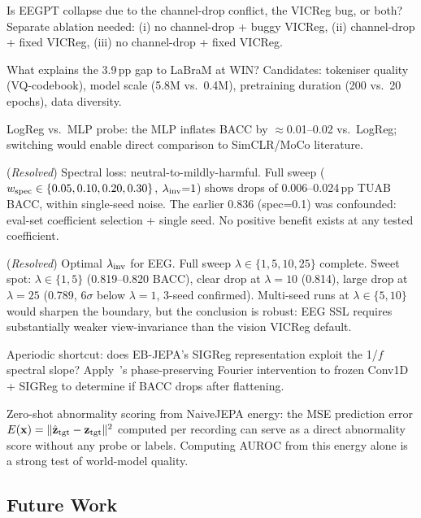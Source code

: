 \documentclass[11pt,a4paper]{article}
\begin{document}
\begin{description}[noitemsep]
  \item[D1] Is EEGPT collapse due to the channel-drop conflict, the VICReg bug, or both?
    Separate ablation needed: (i) no channel-drop + buggy VICReg, (ii) channel-drop +
    fixed VICReg, (iii) no channel-drop + fixed VICReg.
  \item[D2] What explains the 3.9\,pp gap to LaBraM at WIN?
    Candidates: tokeniser quality (VQ-codebook), model scale (5.8M vs.\ 0.4M),
    pretraining duration (200 vs.\ 20 epochs), data diversity.
  \item[D3] LogReg vs.\ MLP probe: the MLP inflates BACC by $\approx$0.01--0.02
    vs.\ LogReg; switching would enable direct comparison to SimCLR/MoCo literature.
  \item[D4] (\emph{Resolved}) Spectral loss: neutral-to-mildly-harmful.
    Full sweep ($w_{\rm spec} \in \{0.05, 0.10, 0.20, 0.30\}$, $\lambda_{\rm inv}{=}1$)
    shows drops of 0.006--0.024\,pp TUAB BACC, within single-seed noise.
    The earlier 0.836 (spec=0.1) was confounded: eval-set coefficient selection + single seed.
    No positive benefit exists at any tested coefficient.
  \item[D7] (\emph{Resolved}) Optimal $\lambda_{\rm inv}$ for EEG.
    Full sweep $\lambda \in \{1, 5, 10, 25\}$ complete.  Sweet spot: $\lambda \in \{1,5\}$
    (0.819--0.820 BACC), clear drop at $\lambda{=}10$ (0.814), large drop at
    $\lambda{=}25$ (0.789, $6\sigma$ below $\lambda{=}1$, 3-seed confirmed).
    Multi-seed runs at $\lambda \in \{5, 10\}$ would sharpen the boundary,
    but the conclusion is robust: EEG SSL requires substantially weaker
    view-invariance than the vision VICReg default.
  \item[D5] Aperiodic shortcut: does EB-JEPA's SIGReg representation exploit the 1/$f$
    spectral slope?  Apply~\cite{spectral_audit}'s phase-preserving Fourier intervention to
    frozen Conv1D + SIGReg to determine if BACC drops after flattening.
  \item[D6] Zero-shot abnormality scoring from NaiveJEPA energy: the MSE prediction error
    $E(\mathbf{x}) = \|\hat{\mathbf{z}}_{\rm tgt} - \mathbf{z}_{\rm tgt}\|^2$ computed per
    recording can serve as a direct abnormality score without any probe or labels.
    Computing AUROC from this energy alone is a strong test of world-model quality.
\end{description}

\subsection{Future Work}
\end{document}
